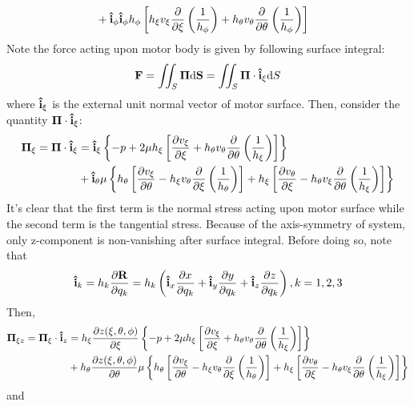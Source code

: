 \documentclass[fontsize=11pt, %
                             paper=a4, %
                             twoside, %
                             captions=tableheading,
                             index=totoc,
                             hyperref]{labbook}
\begin{document}
\begin{addmargin}[4cm]{0cm}
\begin{equation}
\begin{aligned}
&+\mathbf{\hat{i}}_\phi \mathbf{\hat{i}}_\phi h_\phi \left[h_\xi v_\xi \frac{\partial }{\partial \xi} \left(\frac{1}{h_\phi}\right)+h_\theta v_\theta \frac{\partial }{\partial \theta}\left(\frac{1}{h_\phi}\right)\right]
\end{aligned}
\end{equation}
Note the force acting upon motor body is given by following surface integral:
\begin{equation}
\mathbf{F}=\iint_S \mbox{\boldmath$ \Pi $} \mathrm{d}\mathbf{S}=\iint_S \mbox{\boldmath$ \Pi $} \cdot \mathbf{\hat{i}}_\xi \mathrm{d}S
\end{equation}
where $\mathbf{\hat{i}}_\xi$ is the external unit normal vector of motor surface. Then, consider the quantity $\mbox{\boldmath$ \Pi $} \cdot \mathbf{\hat{i}}_\xi$:
\begin{equation}
\begin{aligned}
\mbox{\boldmath$ \Pi $}_\xi=\mbox{\boldmath$ \Pi $} \cdot \mathbf{\hat{i}}_\xi&=
\mathbf{\hat{i}}_\xi \left\{-p+2\mu h_\xi \left[\frac{\partial v_\xi}{\partial \xi}+h_\theta v_\theta \frac{\partial }{\partial \theta}\left(\frac{1}{h_\xi}\right)\right]\right\}\\
&+\mathbf{\hat{i}}_\theta \mu \left\{h_\theta\left[\frac{\partial v_\xi}{\partial \theta}-h_\xi v_\theta \frac{\partial }{\partial \xi}\left(\frac{1}{h_\theta}\right)\right]+h_\xi\left[\frac{\partial v_\theta}{\partial \xi}-h_\theta v_\xi \frac{\partial }{\partial \theta}\left(\frac{1}{h_\xi}\right)\right]\right\}
\end{aligned}
\end{equation}
It's clear that the first term is the normal stress acting upon motor surface while the second term is the tangential stress. Because of the axis-symmetry of system, only z-component is non-vanishing after surface integral. Before doing so, note that
\begin{equation}
\mathbf{\hat{i}}_k=h_k \frac{\partial \mathbf{R}}{\partial q_k}=h_k\left(\mathbf{\hat{i}}_x \frac{\partial x}{\partial q_k} + \mathbf{\hat{i}}_y \frac{\partial y}{\partial q_k} +\mathbf{\hat{i}}_z \frac{\partial z}{\partial q_k}\right), k=1,2,3
\end{equation}
Then,
\begin{equation}\label{eqn_stressz}
\begin{aligned}
\mbox{\boldmath$ \Pi $}_{\xi z}=\mbox{\boldmath$ \Pi $}_\xi \cdot \mathbf{\hat{i}}_z&=
h_\xi\frac{\partial z(\xi,\theta,\phi)}{\partial \xi} \left\{-p+2\mu h_\xi \left[\frac{\partial v_\xi}{\partial \xi}+h_\theta v_\theta \frac{\partial }{\partial \theta}\left(\frac{1}{h_\xi}\right)\right]\right\}\\
&+h_\theta\frac{\partial z(\xi,\theta,\phi)}{\partial \theta} \mu \left\{h_\theta\left[\frac{\partial v_\xi}{\partial \theta}-h_\xi v_\theta \frac{\partial }{\partial \xi}\left(\frac{1}{h_\theta}\right)\right]+h_\xi\left[\frac{\partial v_\theta}{\partial \xi}-h_\theta v_\xi \frac{\partial }{\partial \theta}\left(\frac{1}{h_\xi}\right)\right]\right\}\\
\end{aligned}
\end{equation}
and
\begin{equation}\label{eqn_forcez}

\end{equation}
\end{addmargin}
\end{document}
